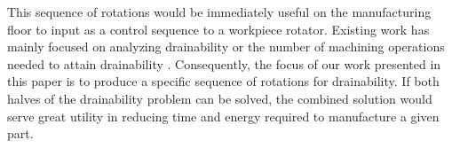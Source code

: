 This sequence of rotations would be immediately useful on the manufacturing floor to input as a control sequence to a workpiece rotator. Existing work has mainly focused on analyzing drainability \cite{Yasui2011} or the number of machining operations needed to attain drainability \cite{Aloupis_draininga}. Consequently, the focus of our work presented in this paper is to produce a specific sequence of rotations for drainability. If both halves of the drainability problem can be solved, the combined solution would serve great utility in reducing time and energy required to manufacture a given part.

